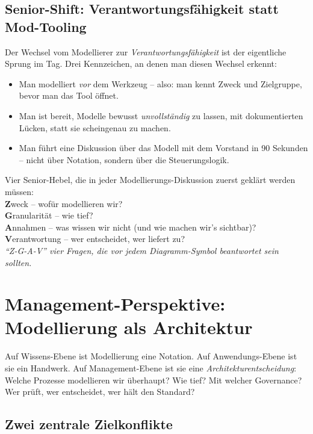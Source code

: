 \documentclass[11pt,a4paper,oneside]{article}
\newcommand{\caveatfontfallback}{\itshape}
\newcommand\caveatfont{\caveatfontfallback}%
\newcommand{\akzent}[1]{{\caveatfont\color{lpAmber}#1}}
\begin{document}
\subsection{Senior-Shift: Verantwortungsfähigkeit statt Mod-Tooling}

Der Wechsel vom Modellierer zur \emph{Verantwortungsfähigkeit} ist der eigentliche Sprung im Tag. Drei Kennzeichen, an denen man diesen Wechsel erkennt:

\begin{itemize}
  \item Man modelliert \emph{vor} dem Werkzeug -- also: man kennt Zweck und Zielgruppe, bevor man das Tool öffnet.
  \item Man ist bereit, Modelle bewusst \emph{unvollständig} zu lassen, mit dokumentierten Lücken, statt sie scheingenau zu machen.
  \item Man führt eine Diskussion über das Modell mit dem Vorstand in 90 Sekunden -- nicht über Notation, sondern über die Steuerungslogik.
\end{itemize}

\begin{eselsbox}[Eselsbrücke: \akzent{Z-G-A-V}]
Vier Senior-Hebel, die in jeder Modellierungs-Diskussion zuerst geklärt werden müssen:\\[2pt]
\textbf{Z}weck -- wofür modellieren wir?\\
\textbf{G}ranularität -- wie tief?\\
\textbf{A}nnahmen -- was wissen wir nicht (und wie machen wir's sichtbar)?\\
\textbf{V}erantwortung -- wer entscheidet, wer liefert zu?\\[2pt]
\emph{``Z-G-A-V'' \textemdash{} vier Fragen, die vor jedem Diagramm-Symbol beantwortet sein sollten.}
\end{eselsbox}

\section{Management-Perspektive: Modellierung als Architektur}

Auf Wissens-Ebene ist Modellierung eine Notation. Auf Anwendungs-Ebene ist sie ein Handwerk. Auf Management-Ebene ist sie eine \emph{Architekturentscheidung}: Welche Prozesse modellieren wir überhaupt? Wie tief? Mit welcher Governance? Wer prüft, wer entscheidet, wer hält den Standard?

\subsection{Zwei zentrale Zielkonflikte}
\end{document}

